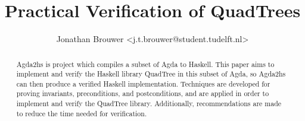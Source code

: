\documentclass[english]{article}
\begin{document}
\title{Practical Verification of QuadTrees}

\author{Jonathan Brouwer <j.t.brouwer@student.tudelft.nl>}
\date{}

\maketitle

\begin{abstract}
Agda2hs is project which compiles a subset of Agda to Haskell. This paper aims to implement and verify the Haskell library QuadTree in this subset of Agda, so Agda2hs can then produce a verified Haskell implementation. Techniques are developed for proving invariants, preconditions, and postconditions, and are applied in order to implement and verify the QuadTree library. Additionally, recommendations are made to reduce the time needed for verification.
\end{abstract}











\end{document}
